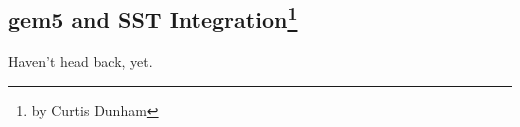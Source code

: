 
\subsection[gem5 and SST Integration]{gem5 and SST Integration\footnote{by Curtis Dunham}}
\label{sec:sst}

Haven't head back, yet.
